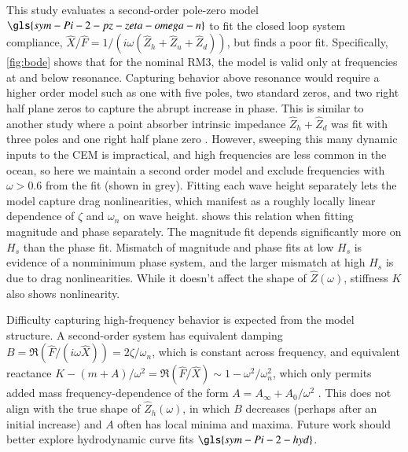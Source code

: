 This study evaluates a second-order pole-zero model $\gls{sym-Pi-2-pz-zeta-omega-n}$ to fit the closed loop system compliance, $\hat{X}/\hat{F}=1/(i\omega(\hat{Z}_h+\hat{Z}_u+\hat{Z}_d))$,  but finds a poor fit.
Specifically, \cref{fig:bode} shows that for the nominal RM3, the model is valid only at frequencies at and below resonance.
Capturing behavior above resonance would require a higher order model such as one with five poles, two standard zeros, and two right half plane zeros to capture the abrupt increase in phase.
This is similar to another study where a point absorber intrinsic impedance $\hat{Z}_h + \hat{Z}_d$ was fit with three poles and one right half plane zero \cite{bacelli_system_2017}.
However, sweeping this many dynamic inputs to the CEM is impractical, and high frequencies are less common in the ocean, so here we maintain a second order model and exclude frequencies with $\omega>0.6$ from the fit (shown in grey).
Fitting each wave height separately lets the model capture drag nonlinearities, which manifest as a roughly locally linear dependence of $\zeta$ and $\omega_n$ on wave height.
 shows this relation when fitting magnitude and phase separately.
The magnitude fit depends significantly more on $H_s$ than the phase fit.
Mismatch of magnitude and phase fits at low $H_s$ is evidence of a nonminimum phase system, and the larger mismatch at high $H_s$ is due to drag nonlinearities.
While it doesn't affect the shape of $\hat{Z}(\omega)$, stiffness $K$ also shows nonlinearity.

Difficulty capturing high-frequency behavior is expected from the model structure. 
A second-order system has equivalent damping $B=\Re(\hat{F}/(i\omega\hat{X}))=2\zeta/\omega_n$, which is constant across frequency, and equivalent reactance $K-(m+A)/\omega^2=\Re(\hat{F}/\hat{X})\sim 1-\omega^2/\omega_n^2$, which only permits added mass frequency-dependence of the form $A = A_\infty + A_0/\omega^2$ \cite{franklin2014feedback}.
This does not align with the true shape of $\hat{Z}_h(\omega)$, in which $B$ decreases (perhaps after an initial increase) and $A$ often has local minima and maxima.
Future work should better explore hydrodynamic curve fits $\gls{sym-Pi-2-hyd}$.



